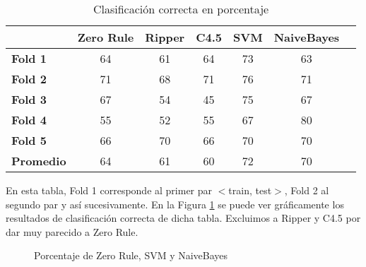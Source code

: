 \begin{table}[H]
	\centering
	\begin{tabular}{|l|c|c|c|c|c|c|}
		\hline
		\textbf{}  & \textbf{Zero Rule} & \textbf{Ripper} & \textbf{C4.5} & \textbf{SVM} & \textbf{NaiveBayes} \\ \hline
		\textbf{Fold 1}  & 64 & 61 & 64 & 73 & 63 \\ \hline
		\textbf{Fold 2}  & 71 & 68 & 71 & 76 & 71 \\ \hline
		\textbf{Fold 3}  & 67 & 54 & 45 & 75 & 67 \\ \hline
		\textbf{Fold 4}  & 55 & 52 & 55 & 67 & 80 \\ \hline
		\textbf{Fold 5}  & 66 & 70 & 66 & 70 & 70 \\ \hline
		\hline \hline
		\textbf{Promedio} & 64 & 61 & 60 & 72 & 70 \\ \hline
	\end{tabular}
	\caption{Clasificación correcta en porcentaje}
	\label{class_corr_en_pct}
\end{table}

En esta tabla, Fold 1 corresponde al primer par $<$train, test$>$, Fold 2 al segundo par y así sucesivamente. En la Figura \ref{porcentajexClasificador} se puede ver gráficamente los resultados de clasificación correcta de dicha tabla. Excluimos a Ripper y C4.5 por dar muy parecido a Zero Rule.

\begin{figure}[H]
	\centering
	\caption{Porcentaje de Zero Rule, SVM y NaiveBayes}
	\label{porcentajexClasificador}
\end{figure}


